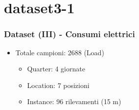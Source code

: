 \documentclass{beamer}
\begin{document}
\section{dataset3-1}
\begin{frame}
    \frametitle{Dataset (III) - Consumi elettrici}
    \vfill
    
    \begin{itemize}
        \item Totale campioni: 2688 (Load) \begin{itemize}   
            \item Quarter: 4 giornate
            \item Location: 7 posizioni
            \item Instance: 96 rilevamenti (15 m)
        \end{itemize}
    \end{itemize}
    \vfill
    \centering

\end{frame}
\end{document}
